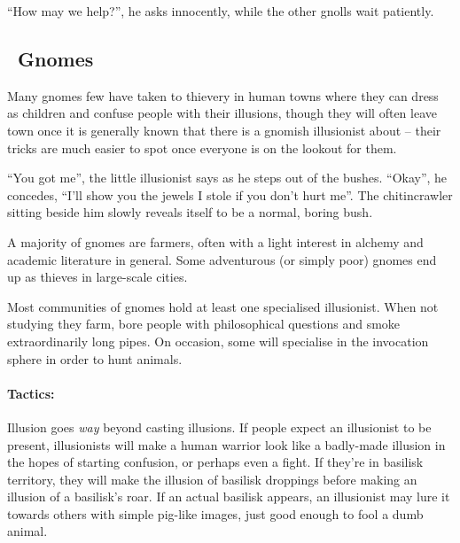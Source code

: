 \begin{multicols}{2}
\begin{boxtext}
  ``How may we help?'', he asks innocently, while the other gnolls wait patiently.

\end{boxtext}

\subsection[Gnomes]{\Gn\ Gnomes}
\label{best_gnomes}

Many gnomes few have taken to thievery in human towns where they can dress as children and confuse people with their illusions, though they will often leave town once it is generally known that there is a gnomish illusionist about -- their tricks are much easier to spot once everyone is on the lookout for them.

\begin{boxtext}

  ``You got me'', the little illusionist says as he steps out of the bushes.
  ``Okay'', he concedes, ``I'll show you the jewels I stole if you don't hurt me''.
  The chitincrawler sitting beside him slowly reveals itself to be a normal, boring bush.

\end{boxtext}

\label{gnomish_citizen}

A majority of gnomes are farmers, often with a light interest in alchemy and academic literature in general.  Some adventurous (or simply poor) gnomes end up as thieves in large-scale cities.


\label{gnomish_illusionist}

Most communities of gnomes hold at least one specialised illusionist.  When not studying they farm, bore people with philosophical questions and smoke extraordinarily long pipes.  On occasion, some will specialise in the invocation sphere in order to hunt animals.


\paragraph{Tactics:} Illusion goes \emph{way} beyond casting illusions.
If people expect an illusionist to be present, illusionists will make a human warrior look like a badly-made illusion in the hopes of starting confusion, or perhaps even a fight.
If they're in basilisk territory, they will make the illusion of basilisk droppings before making an illusion of a basilisk's roar.
If an actual basilisk appears, an illusionist may lure it towards others with simple pig-like images, just good enough to fool a dumb animal.


\end{multicols}
